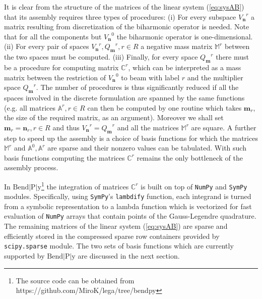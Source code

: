 \documentclass{marine_2015}
\newcommand{\Vh}{\ensuremath{V_{\mathbf{n}}}}
\newcommand{\Qh}{\ensuremath{Q_{\mathbf{m}}}}
\begin{document}
It is clear from the structure of the matrices of the linear system
(\ref{eq:sysAB}) that its assembly requires three types of procedures: (i) For 
every subspace $\Vh^r$ a matrix resulting from discretization of the biharmonic operator is needed.
Note that for all the components but $\Vh^0$ the biharmonic operator is one-dimensional. 
(ii) For every pair of spaces $\Vh^r, \Qh^r, r\in R$ a negative mass
matrix $\mathbb{M}^r$ between the two spaces must be computed. (iii) Finally, for
every space $\Qh^r$ there must be a procedure for computing matrix $\mathbb{C}^r$,
which can be interpreted as a mass matrix between the restriction of $\Vh^0$ to
beam with label $r$ and the multiplier space $\Qh^r$. The number of procedures is 
thus significantly reduced if all the spaces involved in the discrete formulation 
are spanned by the same functions (e.g. all matrices $\mathbb{A}^r, r\in R$ can 
then be computed by one routine which takes $\mathbf{m}_r$, the size of the
required matrix, as an argument). Moreover we shall set $\mathbf{m}_r=\mathbf{n}_r, r\in R$
and thus $\Vh^r=\Qh^r$ and all the matrices $\mathbb{M}^r$ are square. A further 
step to speed up the assembly is a choice of basis functions for which the matrices 
$\mathbb{M}^r$ and $\mathbb{A}^0, \mathbb{A}^r$ are sparse and their nonzero values can be tabulated. With such basis functions 
computing the matrices $\mathbb{C}^r$ remains the only bottleneck of the assembly 
process. 

In $\text{Bend}\!\left|\text{P}\right|\!\text{y}$\footnote{The source code
can be obtained from https://github.com/MiroK/lega/tree/bendpy} the integration of matrices $\mathbb{C}^r$ is built on top of
{\tt{NumPy}}\cite{numpy} and {\tt{SymPy}}\cite{sympy} modules. Specifically, using
{\tt{SymPy}}'s {\tt{lambdify}} function, each integrand is turned from a symbolic 
representation to a lambda function which is vectorized for fast evaluation of 
{\tt{NumPy}} arrays that contain points of the Gauss-Legendre quadrature. 
The remaining matrices of the linear system (\ref{eq:sysAB}) are sparse and 
efficiently stored in the compressed sparse row containers provided by {\tt{scipy.sparse}} module.
The two sets of basis functions which are currently supported by $\text{Bend}\!\left|\text{P}\right|\!\text{y}$
are discussed in the next section.
\end{document}
